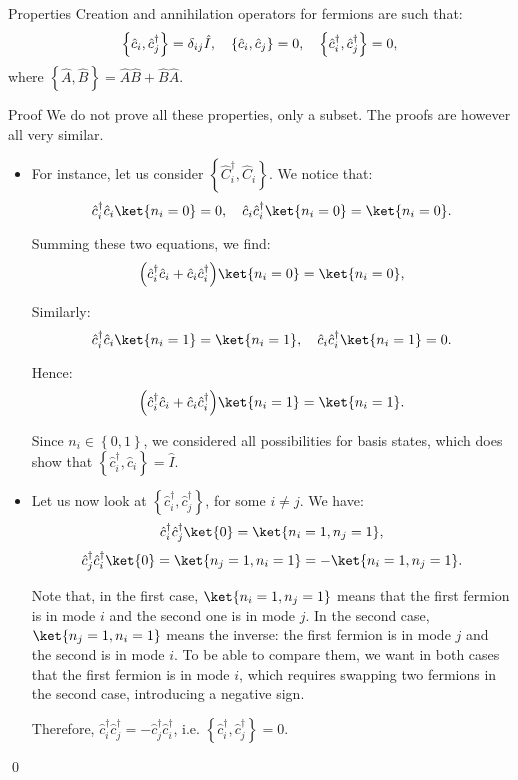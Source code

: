 \documentclass[a4paper]{article}
\begin{document}
\begin{parag}{Properties}
    Creation and annihilation operators for fermions are such that:
    \[\left\{\hat{c}_i, \hat{c}_j^{\dagger}\right\} = \delta_{ij} \hat{I}, \mathspace \left\{\hat{c}_i, \hat{c}_j\right\} = 0, \mathspace \left\{\hat{c}_i^{\dagger}, \hat{c}_j^{\dagger}\right\} = 0,\]
    where $\left\{\hat{A}, \hat{B}\right\} = \hat{A} \hat{B} + \hat{B} \hat{A}$.

    \begin{subparag}{Proof}
        We do not prove all these properties, only a subset. The proofs are however all very similar.
        \begin{itemize}[left=0pt]
            \item For instance, let us consider $\left\{\hat{C}_i^{\dagger}, \hat{C}_i\right\}$. We notice that: 
            \[\hat{c}_i^{\dagger} \hat{c}_i \ket{n_i = 0} = 0, \mathspace \hat{c}_i \hat{c}_i^{\dagger} \ket{n_i=0} = \ket{n_i=0}.\]
            
            Summing these two equations, we find:
            \[\left(\hat{c}_i^{\dagger} \hat{c}_i + \hat{c}_i \hat{c}_i^{\dagger}\right) \ket{n_i = 0} = \ket{n_i=0},\]

            Similarly:
            \[\hat{c}_i^{\dagger} \hat{c}_i \ket{n_i=1} = \ket{n_i=1}, \mathspace \hat{c}_i \hat{c}_i^{\dagger} \ket{n_i=1} = 0.\]
            
            Hence:
            \[\left(\hat{c}_i^{\dagger} \hat{c}_i + \hat{c}_i \hat{c}_i^{\dagger}\right) \ket{n_i = 1} = \ket{n_i=1}.\]

            Since $n_i \in \left\{0, 1\right\}$, we considered all possibilities for basis states, which does show that $\left\{\hat{c}_i^{\dagger}, \hat{c}_i\right\} = \hat{I}$.

            \item Let us now look at $\left\{\hat{c}_i^{\dagger}, \hat{c}_j^{\dagger}\right\}$, for some $i \neq j$. We have:
            \[\hat{c}_i^{\dagger} \hat{c}_j^{\dagger} \ket{0} = \ket{n_i=1, n_j=1},\]
            \[\hat{c}_j^{\dagger} \hat{c}_i^{\dagger} \ket{0} = \ket{n_j=1, n_i=1} = -\ket{n_i=1, n_j=1}.\]

            Note that, in the first case, $\ket{n_i = 1, n_j=1}$ means that the first fermion is in mode $i$ and the second one is in mode $j$. In the second case, $\ket{n_j = 1, n_i = 1}$ means the inverse: the first fermion is in mode $j$ and the second is in mode $i$. To be able to compare them, we want in both cases that the first fermion is in mode $i$, which requires swapping two fermions in the second case, introducing a negative sign.
            
            Therefore, $\hat{c}_i^{\dagger} \hat{c}_j^{\dagger} = - \hat{c}_j^{\dagger} \hat{c}_i^{\dagger}$, i.e. $\left\{\hat{c}_i^{\dagger}, \hat{c}_j^{\dagger}\right\} = 0$.
        \end{itemize}

        \qed
    \end{subparag}
\end{parag}
\end{document}
